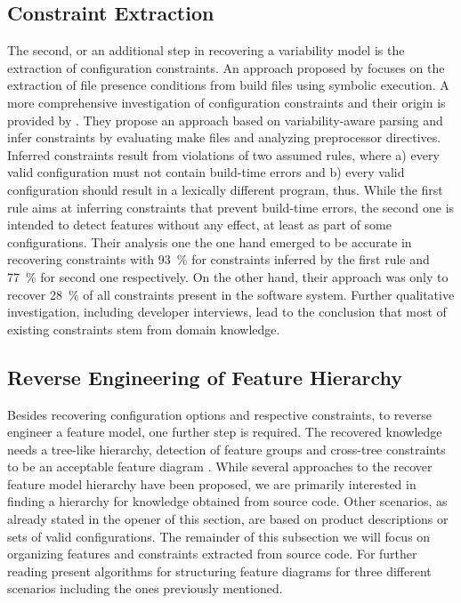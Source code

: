 \subsection{Constraint Extraction}
The second, or an additional step in recovering a variability model is the
extraction of configuration constraints. An approach proposed by \cite{zhou_extracting_2015}
focuses on the extraction of file presence conditions from build files using symbolic execution. A more comprehensive investigation of configuration
constraints and their origin is provided by \cite{nadi_mining_2014,nadi_where_2015}. They
propose an approach based on variability-aware parsing and infer constraints by
evaluating make files and  analyzing preprocessor directives. Inferred
constraints result from violations of two assumed rules, where a) every valid
configuration must not contain build-time errors and b) every valid
configuration should result in a lexically different program, thus. While the
first rule aims at inferring constraints that prevent build-time errors, the
second one is intended to detect features without any effect, at least as part
of some configurations. Their analysis one the one hand emerged to be accurate
in recovering constraints with 93~\% for constraints inferred by the first rule
and 77~\% for second one respectively. On the other hand, their approach was
only to recover 28~\% of all constraints present in the software system.
Further qualitative investigation, including developer interviews, lead to
the conclusion that most of existing constraints stem from domain knowledge.

\subsection{Reverse Engineering of Feature Hierarchy} 
Besides recovering configuration options and respective constraints, to reverse
engineer a feature model, one further step is required. The recovered knowledge
needs a tree-like hierarchy, detection of feature groups and cross-tree
constraints to be an acceptable feature diagram
\citep{kang_feature-oriented_1990}. While several approaches to the recover feature model hierarchy have been proposed,
we are primarily interested in finding a hierarchy for knowledge obtained from
source code. Other scenarios, as already stated in the opener of this section,
are based on product descriptions or sets of valid configurations. The remainder of
this subsection we will focus on organizing features and constraints extracted
from source code. For further reading \cite{andersen_efficient_2012} present algorithms
for structuring feature diagrams for three different scenarios including the
ones previously mentioned.

